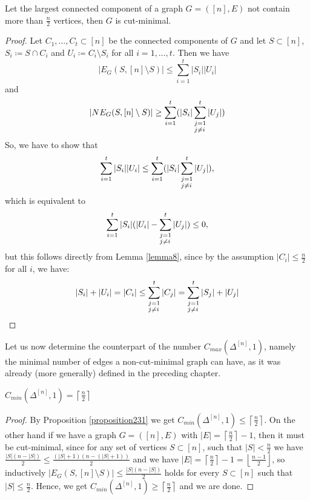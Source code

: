 \begin{prop}
Let the largest connected component of a graph \(G=([n],E)\) not contain more than \(\frac{n}{2}\) vertices, then \(G\) is cut-minimal.
\begin{proof}
Let \(C_1,\ldots,C_t\subset [n]\) be the connected components of \(G\) and let \(S\subset [n]\), \(S_i\coloneqq S\cap C_i\) and \(U_i\coloneqq C_i\setminus S_i\) for all \(i=1,\ldots,t\). Then we have
\[
|E_G(S,[n]\setminus S)|\leq\sum\limits_{i=1}^t|S_i||U_i|
\] 
and
\[
|NE_G(S,[n]\setminus S)|\geq\sum\limits_{i=1}^t(|S_i|\sum_{\begin{subarray}{l}j=1\\ j\neq i\end{subarray}}^t|U_j|)
\]
So, we have to show that
\[
\sum\limits_{i=1}^t|S_i||U_i|\leq\sum\limits_{i=1}^t(|S_i|\sum_{\begin{subarray}{l}j=1\\ j\neq i\end{subarray}}^t|U_j|),
\]
which is equivalent to
\[
\sum\limits_{i=1}^t|S_i|(|U_i|-\sum_{\begin{subarray}{l}j=1\\ j\neq i\end{subarray}}^t|U_j|)\leq 0,
\]
but this follows directly from Lemma \ref{lemma8}, since by the assumption \(|C_i|\leq\frac{n}{2}\) for all \(i\), we have:
\[
|S_i|+|U_i|=|C_i|\leq\sum_{\begin{subarray}{l}j=1\\ j\neq i\end{subarray}}^t|C_j|=\sum_{\begin{subarray}{l}j=1\\ j\neq i\end{subarray}}^t|S_j|+|U_j|
\]
\end{proof}
\end{prop}

Let us now determine the counterpart of the number \(C_{max}(\Delta^{[n]},1)\), namely the minimal number of edges a non-cut-minimal graph can have, as it was already (more generally) defined in the preceding chapter.

\begin{thm}\label{theorem2}
\(C_{min}(\Delta^{[n]},1)=\left\lceil\frac{n}{2}\right\rceil\)
\begin{proof}
By Proposition \ref{proposition231} we get \(C_{min}(\Delta^{[n]},1)\leq\left\lceil\frac{n}{2}\right\rceil\). On the other hand if we have a graph \(G=([n],E)\) with \(|E|=\left\lceil\frac{n}{2}\right\rceil-1\), then it must be cut-minimal, since for any set of vertices \(S\subset[n]\), such that \(|S|<\frac{n}{2}\) we have \(\frac{|S|(n-|S|)}{2}\leq\frac{(|S|+1)(n-(|S|+1))}{2}\) and we have \(|E|=\left\lceil\frac{n}{2}\right\rceil-1=\left\lfloor\frac{n-1}{2}\right\rfloor\), so inductively \(|E_G(S,[n]\setminus S)|\leq\frac{|S|(n-|S|)}{2}\) holds for every \(S\subset [n]\) such that \(|S|\leq\frac{n}{2}\). Hence, we get \(C_{min}(\Delta^{[n]},1)\geq\left\lceil\frac{n}{2}\right\rceil\) and we are done.
\end{proof}
\end{thm}

